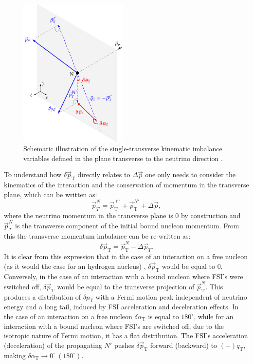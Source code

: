 \begin{figure}[t]
     \centering

         \includegraphics[width=0.48\textwidth]{figures/ch6-TKI/xl_diag.eps}
        \caption[Schematic illustration of the single-transverse kinematic imbalance.]{Schematic illustration of the single-transverse kinematic imbalance variables defined in the plane transverse to the neutrino direction \cite{PhysRevC.94.015503}.} \label{fig:xl_diag}
\end{figure}

To understand how $\delta \Vec{p}_\text{T}$ directly relates to $\Delta \Vec{p}$ one only needs to consider the kinematics of the interaction and the conservation of momentum in the transverse plane, which can be written as:
\begin{equation}
    \Vec{p}_T^N = \Vec{p}_\text{T}^{\ell'}+\Vec{p}_\text{T}^{N'}+\Delta \Vec{p},
\end{equation}
where the neutrino momentum in the transverse plane is 0 by construction and $\Vec{p}_T^N$ is the transverse component of the initial bound nucleon momentum. From this the transverse momentum imbalance can be re-written as: 
\begin{equation}
    \delta \Vec{p}_\text{T} = \Vec{p}_\text{T}^{N}-\Delta \Vec{p}_T.
\end{equation}
It is clear from this expression that in the case of an interaction on a free nucleon (as it would the case for an hydrogen nucleus) , $\delta \Vec{p}_\text{T}$ would be equal to 0. Conversely, in the case of an interaction with a bound nucleon where FSI's were switched off, $\delta \Vec{p}_\text{T}$ would be equal to the transverse projection of $\Vec{p}_\text{T}^{N}$. This produces a distribution of $\delta p_\text{T}$ with a Fermi motion peak independent of neutrino energy and a long tail, induced by FSI acceleration and deceleration effects. In the case of an interaction on a free nucleon $\delta \alpha_\text{T}$ is equal to $180^\circ$, while for an interaction with a bound nucleon where FSI's are switched off, due to the isotropic nature of Fermi motion, it has a flat distribution. The FSI's acceleration (deceleration) of the propagating $N′$  pushes $\delta \Vec{p}_\text{T}$ forward (backward) to $(-)q_\text{T}$, making $\delta \alpha_\text{T}\rightarrow0^\circ \ (180^\circ)$.

